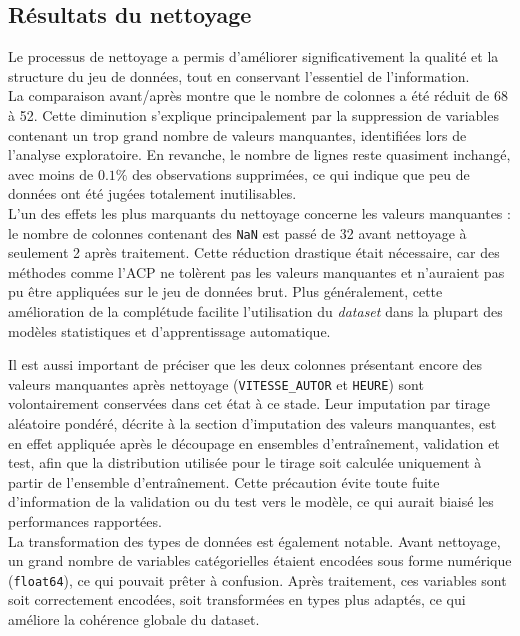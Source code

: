 \documentclass[11pt]{article}
\begin{document}
\subsection{Résultats du nettoyage}

Le processus de nettoyage a permis d'améliorer significativement la qualité et la structure du jeu de données, tout en conservant l’essentiel de l’information. \\

La comparaison avant/après montre que le nombre de colonnes a été réduit de 68 à 52. Cette diminution s’explique principalement par la suppression de variables contenant un trop grand nombre de valeurs manquantes, identifiées lors de l’analyse exploratoire. En revanche, le nombre de lignes reste quasiment inchangé, avec moins de $0.1\%$ des observations supprimées, ce qui indique que peu de données ont été jugées totalement inutilisables. \\

L'un des effets les plus marquants du nettoyage concerne les valeurs manquantes : le nombre de colonnes contenant des \texttt{NaN} est passé de 32 avant nettoyage à seulement 2 après traitement. Cette réduction drastique était nécessaire, car des méthodes comme l'ACP ne tolèrent pas les valeurs manquantes et n'auraient pas pu être appliquées sur le jeu de données brut. Plus généralement, cette amélioration de la complétude facilite l'utilisation du \textit{dataset} dans la plupart des modèles statistiques et d'apprentissage automatique.

Il est aussi important de préciser que les deux colonnes présentant encore des valeurs manquantes après nettoyage (\texttt{VITESSE\_AUTOR} et \texttt{HEURE}) sont volontairement conservées dans cet état à ce stade. Leur imputation par tirage aléatoire pondéré, décrite à la section d'imputation des valeurs manquantes, est en effet appliquée après le découpage en ensembles d'entraînement, validation et test, afin que la distribution utilisée pour le tirage soit calculée uniquement à partir de l'ensemble d'entraînement. Cette précaution évite toute fuite d'information de la validation ou du test vers le modèle, ce qui aurait biaisé les performances rapportées. \\

La transformation des types de données est également notable. Avant nettoyage, un grand nombre de variables catégorielles étaient encodées sous forme numérique (\texttt{float64}), ce qui pouvait prêter à confusion. Après traitement, ces variables sont soit correctement encodées, soit transformées en types plus adaptés, ce qui améliore la cohérence globale du dataset. \\
\end{document}

